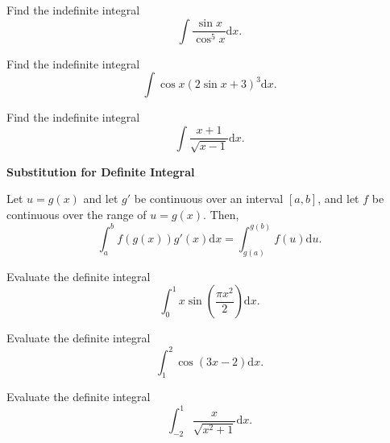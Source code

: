 \begin{example}

Find the indefinite integral
\[\int \dfrac{\sin x}{\cos^5x}\mathrm{d} x.\]

\end{example}
\vspace*{6\baselineskip}

\begin{example}

Find the indefinite integral \[\int \cos x(2\sin x+3)^3\mathrm{d} x.\]

\end{example}
\vspace*{6\baselineskip}

\begin{example}

Find the indefinite integral
\[\int \frac{x+1}{\sqrt{x-1}}\mathrm{d} x.\]

\end{example}
\vspace*{6\baselineskip}

\begin{theorem}

\textbf{Substitution for Definite Integral}

Let \(u=g(x)\) and let \(g'\) be continuous over an interval \([a,b]\),
and let \(f\) be continuous over the range of \(u=g(x).\) Then,
\[\int^b_af(g(x))g'(x)\mathrm{d} x=\int^{g(b)}_{g(a)}f(u)\mathrm{d} u.\]

\end{theorem}

\begin{example}

Evaluate the definite integral
\[\int^1_0 x\sin\left(\dfrac{\pi x^2}{2}\right)\mathrm{d} x.\]

\end{example}
\vspace*{6\baselineskip}

\begin{example}

Evaluate the definite integral \[\int^2_1 \cos(3x-2)\mathrm{d} x.\]

\end{example}
\vspace*{6\baselineskip}

\begin{example}

Evaluate the definite integral
\[\int^1_{-2} \dfrac{x}{\sqrt{x^2+1}}\mathrm{d} x.\]

\end{example}
\vspace*{6\baselineskip}

